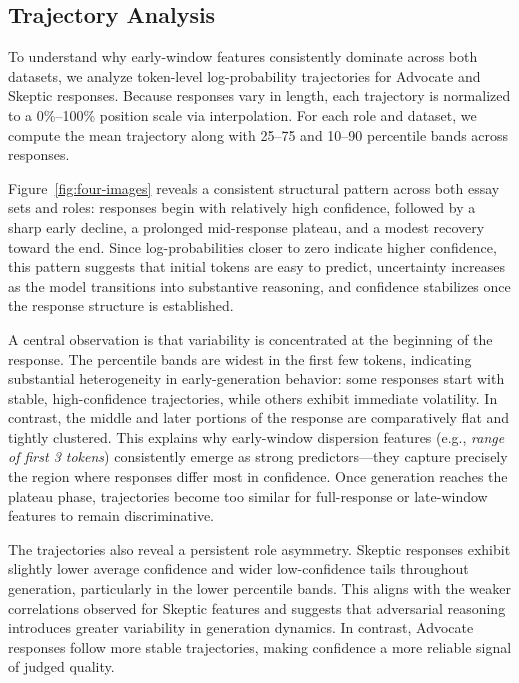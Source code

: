 \documentclass[11pt]{article}
\begin{document}
\subsection{Trajectory Analysis}

To understand why early-window features consistently dominate across both datasets, we analyze token-level log-probability trajectories for Advocate and Skeptic responses. Because responses vary in length, each trajectory is normalized to a 0\%–100\% position scale via interpolation. For each role and dataset, we compute the mean trajectory along with 25–75 and 10–90 percentile bands across responses.

Figure~\ref{fig:four-images} reveals a consistent structural pattern across both essay sets and roles: responses begin with relatively high confidence, followed by a sharp early decline, a prolonged mid-response plateau, and a modest recovery toward the end. Since log-probabilities closer to zero indicate higher confidence, this pattern suggests that initial tokens are easy to predict, uncertainty increases as the model transitions into substantive reasoning, and confidence stabilizes once the response structure is established.

A central observation is that variability is concentrated at the beginning of the response. The percentile bands are widest in the first few tokens, indicating substantial heterogeneity in early-generation behavior: some responses start with stable, high-confidence trajectories, while others exhibit immediate volatility. In contrast, the middle and later portions of the response are comparatively flat and tightly clustered. This explains why early-window dispersion features (e.g., \emph{range of first 3 tokens}) consistently emerge as strong predictors—they capture precisely the region where responses differ most in confidence. Once generation reaches the plateau phase, trajectories become too similar for full-response or late-window features to remain discriminative.

The trajectories also reveal a persistent role asymmetry. Skeptic responses exhibit slightly lower average confidence and wider low-confidence tails throughout generation, particularly in the lower percentile bands. This aligns with the weaker correlations observed for Skeptic features and suggests that adversarial reasoning introduces greater variability in generation dynamics. In contrast, Advocate responses follow more stable trajectories, making confidence a more reliable signal of judged quality.
\end{document}
